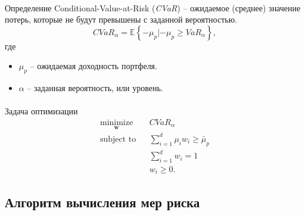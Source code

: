 \documentclass[aspectratio=169]{beamer}
\begin{document}
\begin{frame}{\insertsection}
    \framesubtitle{\insertsubsection}
    \begin{block}{Определение}
        Conditional-Value-at-Risk (\textit{CVaR}) -- ожидаемое (среднее) значение потерь, которые не будут превышены с заданной вероятностью.
        \begin{equation}
            \textit{CVaR}_\alpha = \mathbb{E}\left\{-\mu_p | -\mu_p \ge VaR_\alpha \right\},
        \end{equation}
        где
        \begin{itemize}
            \item $\mu_p$ -- ожидаемая доходность портфеля.
            \item $\alpha$ -- заданная вероятность, или уровень.
        \end{itemize}
    \end{block}
\end{frame}

\begin{frame}{\insertsection}
    \framesubtitle{\insertsubsection}
    \begin{block}{Задача оптимизации}
        \begin{eqnarray}
            \underset{\textbf{w}}{\text{minimize}} & & \textit{CVaR}_\alpha \\
            \text{subject to} & & \sum_{i=1}^d \mu_i w_i \ge \bar{\mu}_p \nonumber \\
            & & \sum_{i=1}^d w_i = 1 \nonumber \\
            & & w_i \ge 0. \nonumber
        \end{eqnarray}
    \end{block}
\end{frame}

\subsection{Алгоритм вычисления мер риска}
\end{document}
